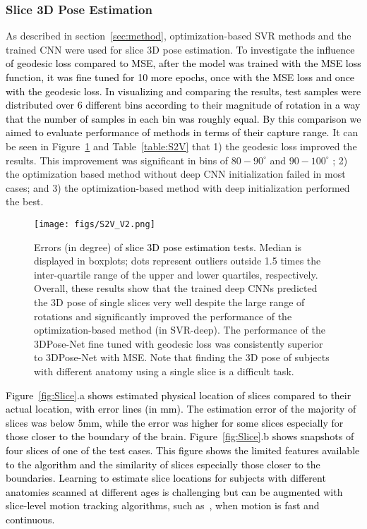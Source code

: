 \documentclass[journal,transmag]{IEEEtran}
\begin{document}
\subsubsection{Slice 3D Pose Estimation}
As described in section~\ref{sec:method}, optimization-based SVR methods and the trained CNN were used for slice 3D pose estimation. \textcolor{black}{To investigate the influence of geodesic loss compared to MSE, after the model was trained with the MSE loss function, it was fine tuned for 10 more epochs, once with the MSE loss and once with the geodesic loss. In visualizing and comparing the results, test samples were distributed over 6 different bins according to their magnitude of rotation in a way that the number of samples in each bin was roughly equal. By this comparison we aimed to evaluate performance of methods in terms of their capture range.} It can be seen in Figure~\ref{fig:S2V} and Table~\ref{table:S2V} that 1) the geodesic loss improved the results. This improvement was significant in bins of $80-90^\circ$ and $90-100^\circ$ ; 2) the optimization based method without deep CNN initialization failed in most cases; and 3) the optimization-based method with deep initialization performed the best.

\begin{figure}
    \centering
    \texttt{[image: figs/S2V\_V2.png]}
    \caption{Errors (in degree) of \textcolor{black}{slice 3D pose estimation} tests. Median is displayed in boxplots; dots represent outliers outside 1.5 times the inter-quartile range of the upper and lower quartiles, respectively. Overall, these results show that the trained deep CNNs predicted the 3D pose of single slices very well despite the large range of rotations and significantly improved the performance of the optimization-based method (in SVR-deep). The performance of the 3DPose-Net fine tuned with geodesic loss was consistently superior to 3DPose-Net with MSE. Note that finding the 3D pose of subjects with different anatomy using a single slice is a difficult task.}
    \label{fig:S2V}
\end{figure}

\textcolor{black}{Figure~\ref{fig:Slice}.a shows estimated physical location of slices compared to their actual location, with error lines (in mm). The estimation error of the majority of slices was below 5mm, while the error was higher for some slices especially for those closer to the boundary of the brain. Figure~\ref{fig:Slice}.b shows snapshots of four slices of one of the test cases. This figure shows the limited features available to the algorithm and the similarity of slices especially those closer to the boundaries. Learning to estimate slice locations for subjects with different anatomies scanned at different ages is challenging but can be augmented with slice-level motion tracking algorithms, such as~\cite{marami2017temporal}, when motion is fast and continuous.}  
\end{document}
